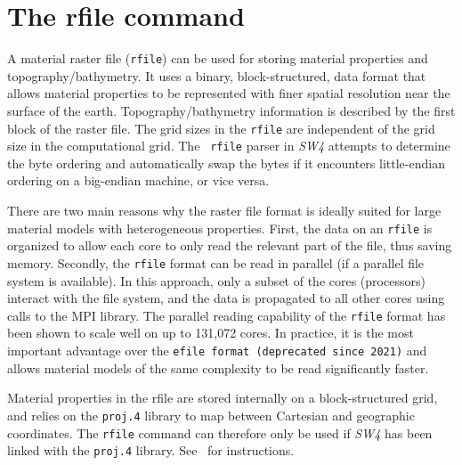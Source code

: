\documentclass[11pt]{report}
\begin{document}

\section{The rfile command} \label{sec:rfile-mat}

A material raster file ({\tt rfile}) can be used for storing material properties and
topography/bathymetry. It uses a binary, block-structured, data format that allows material
properties to be represented with finer spatial resolution near the surface of the
earth. Topography/bathymetry information is described by the first block of the raster file. The
grid sizes in the {\tt rfile} are independent of the grid size in the computational grid. The {\tt
  rfile} parser in \emph{SW4} attempts to determine the byte ordering and automatically swap the
bytes if it encounters little-endian ordering on a big-endian machine, or vice versa.

There are two main reasons why the raster file format is ideally suited for large material models
with heterogeneous properties. First, the data on an {\tt rfile} is organized to allow each core to
only read the relevant part of the file, thus saving memory. Secondly, the {\tt rfile} format can be
read in parallel (if a parallel file system is available). In this approach, only a subset of the
cores (processors) interact with the file system, and the data is propagated to all other cores
using calls to the MPI library. The parallel reading capability of the {\tt rfile}
format has been shown to scale well on up to 131,072 cores. In practice, it is the most important
advantage over the {\tt efile format (deprecated since 2021)} and allows material models of the same complexity to be read
significantly faster. 

Material properties in the rfile are stored internally on a block-structured grid, and relies on the
\verb+proj.4+ library to map between Cartesian and geographic coordinates. The {\tt rfile} command
can therefore only be used if \emph{SW4} has been linked with the \verb+proj.4+
library. See~\cite{SW4-install} for instructions.
\end{document}
